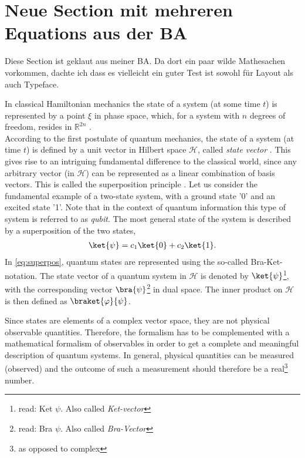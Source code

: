 \section{Neue Section mit mehreren Equations aus der BA}
Diese Section ist geklaut aus meiner BA. Da dort ein paar wilde Mathesachen
vorkommen, dachte ich dass es vielleicht ein guter Test ist sowohl für Layout
als auch Typeface.

In classical Hamiltonian mechanics the state of a system (at some time $t$) is
represented by a point $\xi$ in phase space, which, for a system with $n$
degrees of freedom, resides in $\mathbb{R}^{2n}$
\cite{noltingHamiltonMechanik2014}.\\
According to the first postulate of quantum mechanics, the state of a system
(at time $t$) is defined by a unit vector in Hilbert space $\mathcal{H}$,
called \emph{state vector} \cite{cohen-tannoudjiQuantumMechanicsVolume1977}.
This gives rise to an
intriguing fundamental difference to the classical world, since any arbitrary
vector (in $\mathcal{H}$) can be represented as a linear combination of basis
vectors.  This is called the superposition principle
\cite{poschelFourierreihen2015, messiahQuantumMechanics1991}.
Let us consider the fundamental example of a two-state system, with a ground state '0' and an excited state '1'.
Note that in the context of quantum information this type of system is referred to as \emph{qubit}.
The most general state of the system is described by a superposition of the two states,  
\begin{align}\label{eq:superpos}
    \ket{\psi} = c_1 \ket{0} + c_2 \ket{1}.
\end{align}
In \cref{eq:superpos}, quantum states are represented using the so-called Bra-Ket-notation. 
The state vector of a quantum system in $\mathcal{H}$ is denoted by $\ket{\psi}$\footnote{read: Ket $\psi$. Also called \emph{Ket-vector}},
with the corresponding vector $\bra{\psi}$\footnote{read: Bra $\psi$. Also called \emph{Bra-Vector}} in dual space.
The inner product on $\mathcal{H}$ is then defined as
$\braket{\varphi}{\psi}$.
\par
Since states are elements of a complex vector space, they are not physical observable quantities. Therefore, the formalism
has to be complemented with a mathematical formalism of observables in order to get a complete and meaningful description of quantum systems.
In general, physical quantities can be measured (observed) and the outcome of such a measurement should therefore be
a real\footnote{as opposed to complex} number.

